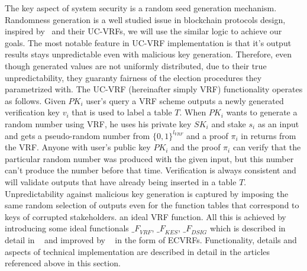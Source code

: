 The key aspect of system security is a random seed generation mechanism.
Randomness generation is a well studied issue in blockchain protocols design, inspired by~\cite{cryptoeprint:2017/573} and their UC-VRFs, we will use the similar logic to achieve our goals.
The most notable feature in UC-VRF implementation is that it's output results stays unpredictable even with malicious key generation.
Therefore, even though generated values are not uniformly distributed, due to their true unpredictability, they guaranty fairness of the election procedures they parametrized with.
The UC-VRF (hereinafter simply VRF) functionality operates as follows.
Given $PK_i$ user's query a VRF scheme outputs a newly generated verification key $v_i$ that is used to label a table $T$.
When $PK_i$ wants to generate a random number using VRF, he uses his private key $SK_i$ and stake $s_i$ as an input and gets a pseudo-random number from ${\{0, 1\}^{l_{VRF}}}$ and a proof $\pi_i$ in returns from the VRF\@.
Anyone with user's public key $PK_i$ and the proof $\pi_i$ can verify that the particular random number was produced with the given input, but this number can't produce the number before that time.
Verification is always consistent and will validate outputs that have already being inserted in a table $T$.
Unpredictability against malicious key generation is captured by imposing the same random selection of outputs even for the function tables that correspond to keys of corrupted stakeholders.
an ideal VRF function.
All this is achieved by introducing some ideal functionals ${\mathcal_{F}}_{VRF}$, ${\mathcal_{F}}_{KES}$, ${\mathcal_{F}}_{DSIG}$ which is described in detail in ~\cite{cryptoeprint:2017/573} and improved by ~\cite{cryptoeprint:2022/1045} in the form of ECVRFs.
Functionality, details and aspects of technical implementation are described in detail in the articles referenced above in this section.

